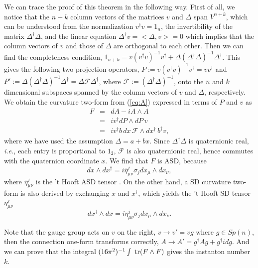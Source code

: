 \documentclass[a4paper,10pt]{article}
\newcommand{\ie}{\textit{i.e.}}
\begin{document}
We can trace the proof of this theorem in the following way.
First of all, we notice that the $n+k$ column vectors of the matrices $v$ and $\Delta$ span $V^{n+k}$, which can be understood from the normalization $v^\dagger v=1_n$, the invertibility of the matrix $\Delta^\dagger \Delta$,
and the linear equation  $\Delta^\dagger v=<\Delta,v>=0$ which implies that the column vectors of $v$ and  those of $\Delta$ are orthogonal to each other.
Then we can find the completeness condition, $1_{n+k}=v(v^{\dagger}v)^{-1}v^{\dagger}+\Delta(\Delta^{\dagger}\Delta)^{-1}\Delta^{\dagger}$.
This gives the following two projection operators,
$P:=v(v^{\dagger}v)^{-1}v^\dagger=vv^\dagger$ and $P':=\Delta(\Delta^{\dagger}\Delta)^{-1}\Delta^{\dagger}=\Delta \mathcal{F} \Delta^{\dagger}$, where $\mathcal{F}:=(\Delta^{\dagger}\Delta)^{-1}$, onto the $n$ and $k$ dimensional subspaces spanned by the column vectors of $v$ and $\Delta$, respectively.
We obtain the curvature two-form from (\ref{eq:A})  expressed in terms of $P$ and $v$ as
\begin{eqnarray}
F&=&dA-iA\wedge A\nonumber\\
&=&iv^{\dagger}dP \wedge dP\,v\nonumber\\
&=&iv^{\dagger}b\, dx\,\mathcal{F}\wedge dx^{\dagger}\,b^{\dagger}v,
\end{eqnarray}
where we have used the assumption $\Delta=a+bx$. 
Since $\Delta^\dagger \Delta$ is quaternionic real, \ie, each entry is proportional to $1_2$, $\mathcal{F}$ is also quaternionic real, hence commutes with the quaternion coordinate $x$.
We find that $F$ is ASD, because
\begin{equation}
dx \wedge dx^{\dagger}=i\bar{\eta}^j_{\mu\nu}\sigma_jdx_\mu 
\wedge dx_\nu,
\end{equation}
where $\bar{\eta}^j_{\mu\nu}$ is the 't Hooft ASD tensor \cite{'tH}.
On the other hand, a SD curvature two-form is also derived by exchanging $x$ and $x^\dagger$, which yields the 't Hooft SD tensor ${\eta}^j_{\mu\nu}$ \cite{'tH}
\begin{equation}
dx^{\dagger} \wedge 
dx=i\eta^j_{\mu\nu}\sigma_jdx_\mu \wedge dx_\nu.
\end{equation}


Note that the gauge group acts on $v$ on the right, $v \to v'=vg$ where $g \in Sp(n)$, then the connection one-form transforms correctly, $A \to A'=g^\dagger A g+g^\dagger idg$.
And we can prove that the integral $(16\pi^2)^{-1}\int\;{\rm tr}(F \wedge F)$ gives the instanton number $k$.
\end{document}
